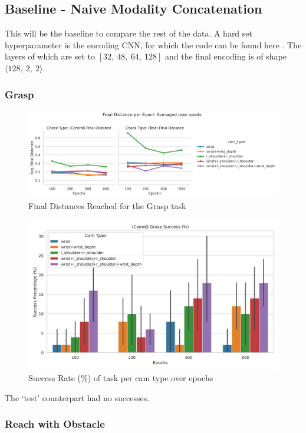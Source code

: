 \subsection{Baseline - Naive Modality Concatenation}
This will be the baseline to compare the rest of the data. A hard set hyperparameter is the encoding CNN, for which the code can be found here . The layers of which are set to $\left[32, ~48, ~64, ~128\right]$ and the final encoding is of shape \(\langle 128, ~2, ~2 \rangle\).


\subsubsection{Grasp}
\begin{figure}[htpb]
  \centering
  \includegraphics[width=\linewidth]{assets/evaluation/baseline/base-grasp-final.png}
  \caption{Final Distances Reached for the Grasp task}\label{fig:base-grasp-final}
\end{figure}

\begin{figure}[htpb]
  \centering
  \includegraphics[width=0.6\linewidth]{assets/evaluation/baseline/base-grasp-control-success-cams-epochs.png}
  \caption{Success Rate (\%) of task per cam type over epochs}\label{fig:base-grasp-control-success}
\end{figure}
The `test' counterpart had no successes.


\subsubsection{Reach with Obstacle}

